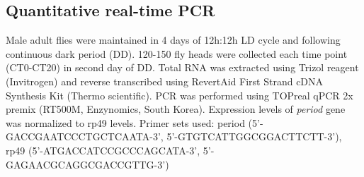 \subsection*{Quantitative real-time PCR}

Male adult flies were maintained in 4 days of 12h:12h LD cycle and following continuous dark period (DD). 120-150 fly heads were collected each time point (CT0-CT20) in second day of DD.
Total RNA was extracted using Trizol reagent (Invitrogen) and reverse transcribed using RevertAid First Strand cDNA Synthesis Kit (Thermo scientific).
PCR was performed using TOPreal qPCR 2x premix (RT500M, Enzynomics, South Korea). Expression levels of \emph{period} gene was normalized to rp49 levels.
Primer sets used: period (5'-GACCGAATCCCTGCTCAATA-3', 5'-GTGTCATTGGCGGACTTCTT-3'), rp49 (5'-ATGACCATCCGCCCAGCATA-3', 5'-GAGAACGCAGGCGACCGTTG-3')
    
  
  
  
  
  